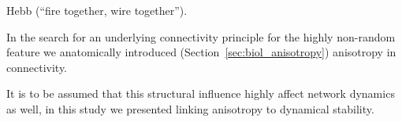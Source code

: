 

Hebb
(\enquote{fire together, wire together}). 


In the search for an underlying connectivity principle for the highly
non-random feature we anatomically introduced
(Section~\ref{sec:biol_anisotropy}) anisotropy in connectivity.

It is to be assumed that this structural influence highly affect
network dynamics as well, in this study we presented linking
anisotropy to dynamical stability.



